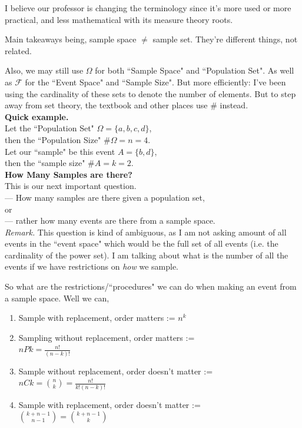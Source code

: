 \documentclass[12pt]{book}
\begin{document}
I believe our professor is changing the terminology since it's more used or more practical, and less mathematical with its measure theory roots.

Main takeaways being, sample space $\neq$ sample set. They're different things, not related.

Also, we may still use $\Omega$ for both ``Sample Space" and ``Population Set".
As well as $\mathcal{F}$ for the ``Event Space" and ``Sample Size".
But more efficiently: I've been using the cardinality of these sets to denote the number of elements. But to step away from set theory, the textbook and other places use $\#$ instead.\\

\noindent \textbf{Quick example.}\\
Let the ``Population Set" $\Omega=\{a,b,c,d\}$,\\
then the ``Population Size" $\# \Omega = n = 4$.\\

\noindent Let our ``sample" be this event $A = \{b,d\}$,\\
then the ``sample size" $\# A = k = 2$.\\

\noindent \textbf{How Many Samples are there?}\\
This is our next important question. \\
--- How many samples are there given a population set, \\
or \\
--- rather how many events are there from a sample space.\\

\noindent \textit{Remark.} This question is kind of ambiguous, as I am not asking amount of all events in the ``event space" which would be the full set of all events (i.e. the cardinality of the power set). I am talking about what is the number of all the events if we have restrictions on \textit{how} we sample. 

So what are the restrictions/``procedures" we can do when making an event from a sample space. Well we can,
\begin{enumerate}
\item Sample with replacement, order matters := $n^k$
\item Sampling without replacement, order matters := \\$nPk = \frac{n!}{(n-k)!}$
\item Sample without replacement, order doesn't matter := $nCk = {n \choose k} = \frac{n!}{k!(n-k)!}$
\item Sample with replacement, order doesn't matter := \\${k+n-1 \choose n-1}={k+n-1 \choose k}$ 
\end{enumerate}
\end{document}
